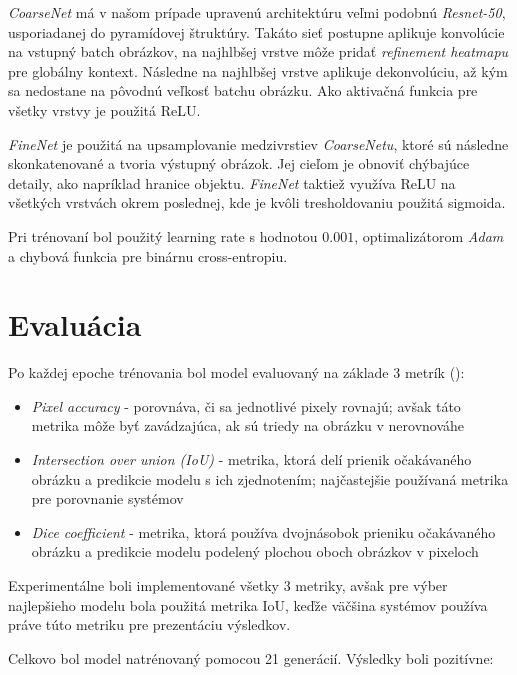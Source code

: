 \documentclass [11pt, a4paper, twocolumn]{article}
\begin{document}
\textit{CoarseNet} má v našom prípade upravenú architektúru veľmi podobnú \textit{Resnet-50}, usporiadanej do pyramídovej štruktúry. Takáto sieť postupne aplikuje konvolúcie na vstupný batch obrázkov, na najhlbšej vrstve môže pridať \textit{refinement heatmapu} pre globálny kontext. Následne na najhlbšej vrstve aplikuje dekonvolúciu, až kým sa nedostane na pôvodnú veľkosť batchu obrázku. Ako aktivačná funkcia pre všetky vrstvy je použitá ReLU.

\textit{FineNet} je použitá na upsamplovanie medzivrstiev \textit{CoarseNetu}, ktoré sú následne skonkatenované a tvoria výstupný obrázok. Jej cieľom je obnoviť chýbajúce detaily, ako napríklad hranice objektu. \textit{FineNet} taktiež využíva ReLU na všetkých vrstvách okrem poslednej, kde je kvôli tresholdovaniu použitá sigmoida.

Pri trénovaní bol použitý learning rate s hodnotou $0.001$, optimalizátorom \textit{Adam} a chybová funkcia pre binárnu cross-entropiu.

\section{Evaluácia}
Po každej epoche trénovania bol model evaluovaný na základe 3 metrík (\cite{tiu_2020}):

\begin{itemize}
\item \textit{Pixel accuracy} - porovnáva, či sa jednotlivé pixely rovnajú; avšak táto metrika môže byť zavádzajúca, ak sú triedy na obrázku v nerovnováhe
\item \textit{Intersection over union (IoU)} - metrika, ktorá delí prienik očakávaného obrázku a predikcie modelu s ich zjednotením; najčastejšie používaná metrika pre porovnanie systémov
\item \textit{Dice coefficient} - metrika, ktorá používa dvojnásobok prieniku očakávaného obrázku a predikcie modelu podelený plochou oboch obrázkov v pixeloch 
\end{itemize}
Experimentálne boli implementované všetky 3 metriky, avšak pre výber najlepšieho modelu bola použitá metrika IoU, keďže väčšina systémov používa práve túto metriku pre prezentáciu výsledkov.



Celkovo bol model natrénovaný pomocou 21 generácií. Výsledky boli pozitívne:
\end{document}
